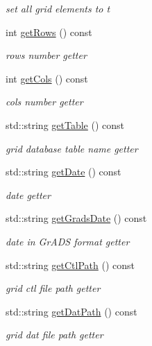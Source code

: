 \begin{DoxyCompactItemize}
\begin{DoxyCompactList}\small\item\em set all grid elements to t \end{DoxyCompactList}\item 
int \hyperlink{classfwi_1_1grid_1_1Grid_a7c43b6bb6f6b0d61a6669bd5c7ea8c7a}{get\-Rows} () const 
\begin{DoxyCompactList}\small\item\em rows number getter \end{DoxyCompactList}\item 
int \hyperlink{classfwi_1_1grid_1_1Grid_aaf9b9814c8f513ceba002b75542620c9}{get\-Cols} () const 
\begin{DoxyCompactList}\small\item\em cols number getter \end{DoxyCompactList}\item 
std\-::string \hyperlink{classfwi_1_1grid_1_1Grid_afc3fafe3429aa908a9af84674dc4c1ee}{get\-Table} () const 
\begin{DoxyCompactList}\small\item\em grid database table name getter \end{DoxyCompactList}\item 
std\-::string \hyperlink{classfwi_1_1grid_1_1Grid_ac7c89b5eb43447e86ea0b5b956a8b88d}{get\-Date} () const 
\begin{DoxyCompactList}\small\item\em date getter \end{DoxyCompactList}\item 
std\-::string \hyperlink{classfwi_1_1grid_1_1Grid_a51a7b639a01826dc7437d646930f6891}{get\-Grads\-Date} () const 
\begin{DoxyCompactList}\small\item\em date in Gr\-A\-D\-S format getter \end{DoxyCompactList}\item 
std\-::string \hyperlink{classfwi_1_1grid_1_1Grid_a4be1b06ee3d8c6a4eabdd3a402ae3bf9}{get\-Ctl\-Path} () const 
\begin{DoxyCompactList}\small\item\em grid ctl file path getter \end{DoxyCompactList}\item 
std\-::string \hyperlink{classfwi_1_1grid_1_1Grid_a23e0a0d0fa907ccfbc0881240dc528a2}{get\-Dat\-Path} () const 
\begin{DoxyCompactList}\small\item\em grid dat file path getter \end{DoxyCompactList}\item 

\end{DoxyCompactItemize}
